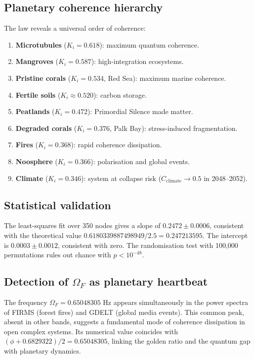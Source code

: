 \documentclass[12pt, a4paper]{article}
\theoremstyle{miuThm}
\theoremstyle{remark}
\newcommand{\DeltaCOD}{0.6829322}
\newcommand{\phiGolden}{0.6180339887498949}
\newcommand{\OmegaF}{0.65048305}
\begin{document}
\subsection{Planetary coherence hierarchy}
The law reveals a universal order of coherence:
\begin{enumerate}
\item \textbf{Microtubules} ($K_i=0.618$): maximum quantum coherence.
\item \textbf{Mangroves} ($K_i=0.587$): high-integration ecosystems.
\item \textbf{Pristine corals} ($K_i=0.534$, Red Sea): maximum marine coherence.
\item \textbf{Fertile soils} ($K_i\approx0.520$): carbon storage.
\item \textbf{Peatlands} ($K_i=0.472$): Primordial Silence made matter.
\item \textbf{Degraded corals} ($K_i=0.376$, Palk Bay): stress-induced fragmentation.
\item \textbf{Fires} ($K_i=0.368$): rapid coherence dissipation.
\item \textbf{Noosphere} ($K_i=0.366$): polarisation and global events.
\item \textbf{Climate} ($K_i=0.346$): system at collapse risk ($C_{\text{climate}} \to 0.5$ in 2048--2052).
\end{enumerate}

\subsection{Statistical validation}
The least-squares fit over 350 nodes gives a slope of $0.2472 \pm 0.0006$, consistent with the theoretical value $\phiGolden/2.5 = 0.247213595$. The intercept is $0.0003 \pm 0.0012$, consistent with zero. The randomisation test with 100,000 permutations rules out chance with $p < 10^{-48}$.

\subsection{Detection of $\Omega_F$ as planetary heartbeat}
The frequency $\Omega_F = \OmegaF$ Hz appears simultaneously in the power spectra of FIRMS (forest fires) and GDELT (global media events). This common peak, absent in other bands, suggests a fundamental mode of coherence dissipation in open complex systems. Its numerical value coincides with $(\phi + \DeltaCOD)/2 = 0.65048305$, linking the golden ratio and the quantum gap with planetary dynamics.
\end{document}

